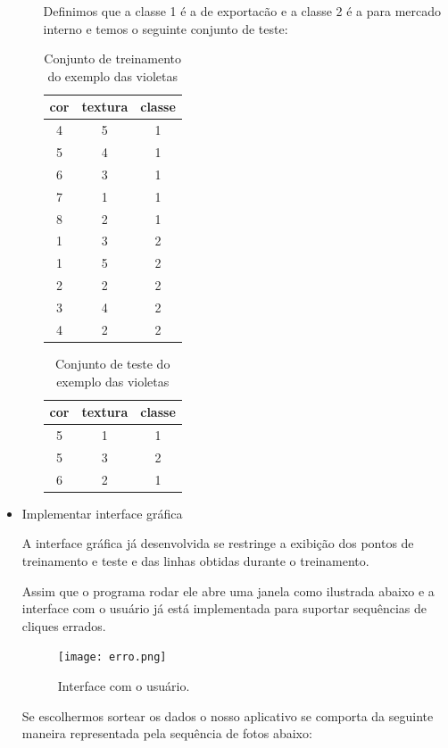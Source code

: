 \documentclass[brazil, a4paper]{article}
\begin{document}
\begin{itemize}
\begin{itemize}
	Definimos que a classe 1 é a de exportacão e a classe 2 é a para mercado interno e temos o seguinte conjunto de teste:
	\begin{table}[h]
			\centering
			\begin{tabular}{|c|c|c|}
			\hline
			cor & textura & classe \\ \hline
			4 &5 & 1 \\
			5 & 4 & 1 \\
			6 & 3 & 1 \\
			7 & 1 & 1 \\
			8 & 2 & 1 \\
			1 & 3 & 2 \\
			1 & 5 & 2 \\
			2 & 2 & 2 \\
			3 & 4 & 2 \\
			4 & 2 & 2 \\ \hline
			\end{tabular}
			\caption{Conjunto de treinamento do exemplo das violetas}
		\end{table}

	\begin{table} [h]
			\centering
			\begin{tabular}{|c|c|c|}
			\hline
			cor & textura & classe \\ \hline
			5 & 1 & 1 \\
			5 & 3 & 2 \\
			6 & 2 & 1 \\ \hline
			\end{tabular}
			\caption{Conjunto de teste do exemplo das violetas}
		\end{table}
\end{itemize}

\item Implementar interface gráfica

A interface gráfica já desenvolvida se restringe a exibição dos pontos de treinamento e teste e das linhas obtidas durante o treinamento.

Assim que o programa rodar ele abre uma janela como ilustrada abaixo e a interface com o usuário já está implementada para suportar sequências de cliques errados.

\newpage

\begin{figure}[!htb]
\centering
\texttt{[image: erro.png]}
\caption{Interface com o usuário.}
\end{figure}

Se escolhermos sortear os dados o nosso aplicativo se comporta da seguinte maneira representada pela sequência de fotos abaixo:


\end{itemize}
\end{document}

